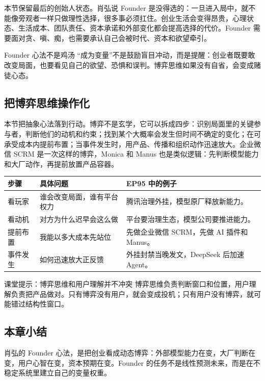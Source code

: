\documentclass[a4paper]{article}
\begin{document}
本节保留最后的创始人状态。肖弘说 Founder 是没得选的：一旦进入局中，就不能像旁观者一样只做理性选择，很多事必须扛住。创业生活会变得昂贵，心理状态、生活成本、团队责任、资本承诺和外部变化都会提高选择的代价。Founder 需要面对贪、嗔、痴，也需要承认自己会被时代、资本和欲望牵引。

\begin{warningbox}{Founder 心法不是鸡汤}
“成为变量”不是鼓励盲目冲动，而是提醒：创业者既要敢改变局面，也要看见自己的欲望、恐惧和误判。博弈思维如果没有自省，会变成赌徒心态。
\end{warningbox}

\subsection{把博弈思维操作化}

本节把抽象心法落到行动。博弈不是玄学，它可以拆成四步：识别局面里的关键参与者，判断他们的动机和约束；找到某个大概率会发生但时间不确定的变化；在可承受成本内提前布置；当事件发生时，用产品、传播和组织动作迅速放大。企业微信 SCRM 是一次这样的博弈，Monica 和 Manus 也是类似逻辑：先判断模型能力和大厂动作，再提前放置产品容器。

\noindent\begin{tabularx}{\textwidth}{p{}p{}X}
\toprule
步骤 & 具体问题 & EP95 中的例子 \\
\midrule
看玩家 & 谁会改变局面，谁有平台权力 & 腾讯治理外挂，模型原厂释放新能力。 \\
看动机 & 对方为什么迟早会这么做 & 平台要治理生态，模型公司要推进能力。 \\
提前布置 & 我能以多大成本先站位 & 先做企业微信 SCRM，先做 AI 插件和 Manus。 \\
事件发生 & 如何迅速放大正反馈 & 外挂封禁当晚发文，DeepSeek 后加速 Agent。 \\
\bottomrule
\end{tabularx}

\begin{knowledgebox}{课堂提示：博弈思维和用户理解并不冲突}
博弈思维负责判断窗口和位置，用户理解负责把产品做对。只有博弈没有用户，就会变成投机；只有用户没有博弈，就可能错过结构性窗口。
\end{knowledgebox}

\subsection{本章小结}

肖弘的 Founder 心法，是把创业看成动态博弈：外部模型能力在变，大厂判断在变，用户心智在变，资本预期在变。Founder 的任务不是线性预测未来，而是在不稳定系统里建立自己的变量权重。
\end{document}
